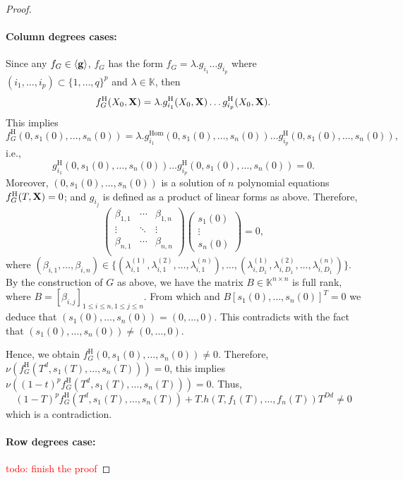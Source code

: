 \documentclass[11pt]{article}
\numberwithin{Property}{section}
\numberwithin{Theorem}{section}
\numberwithin{Proposition}{section}
\numberwithin{Lemma}{section}
\numberwithin{Corollary}{section}
\numberwithin{Definition}{section}
\numberwithin{Remark}{section}
\numberwithin{Conjecture}{section}
\numberwithin{Problem}{section}
\numberwithin{Claim}{section}
\theoremstyle{definition}
\numberwithin{Example}{section}
\renewcommand{\leq}{\leqslant}
\newcommand{\field}{\mathbb{K}} %
\newcommand{\mat}[1]{\mathbf{\MakeUppercase{#1}}} %
\newcommand{\todo}[1]{\textcolor{red}{#1}} %
\begin{document}
\begin{proof}
\paragraph{Column degrees cases:} Since any $f_G \in \langle {\bf g} \rangle$, $f_G$ has the form $f_G = \lambda. g_{i_1} \ldots g_{i_p}$ where $(i_1, \ldots, i_p)\subset \{1, \ldots, q\}^p$ and $\lambda \in \field$, then 
\[
f_G^{\mathrm{H}}(X_0, \mat{X}) = \lambda.g_{i_1}^{\mathrm{H}}(X_0,\mat{X}) \ldots g_{i_p}^{\mathrm{H}}(X_0, \mat{X}).
\] This implies 
\[
f_G^{\mathrm{H}}(0, s_1(0), \ldots, s_n(0)) = \lambda.g_{i_1}^{\mathrm{Hom}}(0, s_1(0), \ldots, s_n(0)) \ldots g_{i_p}^{\mathrm{H}}(0, s_1(0),\ldots, s_n(0)),
\] i.e., 
\[
g_{i_1}^{\mathrm{H}}(0, s_1(0), \ldots, s_n(0)) \ldots g_{i_p}^{\mathrm{H}}(0, s_1(0), \ldots, s_n(0)) = 0.
\]
Moreover, $(0, s_1(0), \ldots, s_n(0))$ is a solution of $n$ polynomial equations $f_G^{\mathrm{H}}(T, \mat{X}) = 0$; and $g_{i_j}$ is defined as a product of linear forms as above. Therefore, 
\[
\left( \begin{matrix}
\beta_{1,1} & \cdots & \beta_{1,n}\\
\vdots &  \ddots & \vdots \\
\beta_{n,1} & \cdots & \beta_{n,n}\\
\end{matrix} \right)\left(\begin{matrix}
s_1(0)\\
\vdots \\
s_n(0)
\end{matrix}\right) = 0,
\]
where $(\beta_{i,1}, \ldots, \beta_{i,n}) \in \{(\lambda_{i,1}^{(1)}, \lambda_{i,1}^{(2)}, \ldots, \lambda_{i,1}^{(n)}), \ldots, (\lambda_{i,D_1}^{(1)}, \lambda_{i,D_1}^{(2)}, \ldots, \lambda_{i,D_1}^{(n)})\}$. By the construction of $G$ as above, we have the matrix $B \in \field^{n \times n}$ is full rank, where $B = [\beta_{i,j}]_{1 \leq i \leq n, 1 \leq j \leq n}$. From which and $B[s_1(0), \ldots, s_n(0)]^T = 0$ we deduce that $(s_1(0), \ldots, s_n(0)) = (0, ..., 0)$. This contradicts with the fact that $(s_1(0), \ldots, s_n(0)) \ne (0, \ldots, 0)$. 

Hence, we obtain $f_G^{\mathrm{H}}(0, s_1(0),\ldots, s_n(0)) \ne 0$. Therefore, $\nu(f_G^{\mathrm{H}}(T^d, s_1(T), \ldots, s_n(T))) = 0$, this implies $\nu((1-t)^pf_G^{\mathrm{H}}(T^d, s_1(T), \ldots, s_n(T))) = 0$. Thus, \[(1-T)^pf_G^{\mathrm{H}}(T^d, s_1(T), \ldots, s_n(T))  + T.h(T, f_1(T), \ldots, f_n(T))T^{Dd} \neq 0\] which is a contradiction. 
\paragraph{Row degrees case:} \todo{todo: finish the proof}

\end{proof}
\end{document}
